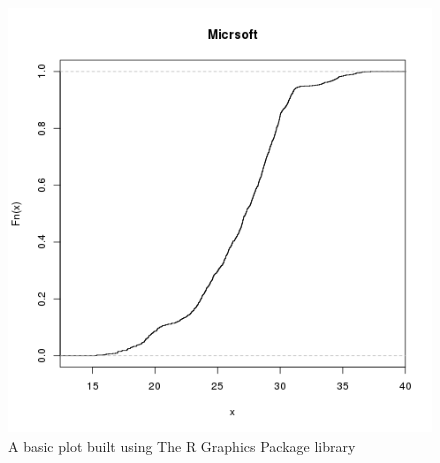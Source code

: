 \documentclass[
  twoside,
  11pt, a4paper,
  footinclude=true,
  headinclude=true,
  cleardoublepage=empty
]{scrreprt}
\begin{document}
    \begin{figure}[h]
        \includegraphics[scale=0.5]{img_examples/RPlotExample.png}
        \centering
        \caption{A basic plot built using The R Graphics Package library}
        \label{fig:RPlotExampl}
    \end{figure}
    
     
\end{document}
